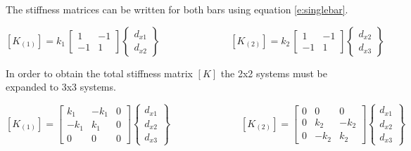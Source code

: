 \begin{enumerate}
    The stiffness matrices can be written for both bars using equation \ref{e:singlebar}.

    \begin{equation}
      \left[K_{(1)}\right] = k_1 \,
      \left[ \begin{array}{rr}
          1  &-1   \\
          -1  &1
        \end{array} \right]
      \begin{Bmatrix}
        d_{x1} \\ d_{x2}
      \end{Bmatrix}
      \hspace{3cm}
      \left[K_{(2)}\right] = k_2 \,
      \left[ \begin{array}{rr}
          1  &-1   \\
          -1  &1
        \end{array} \right]
      \begin{Bmatrix}
        d_{x2} \\ d_{x3}
      \end{Bmatrix}
    \end{equation}

    In order to obtain the total stiffness matrix $[K]$ the 2x2
    systems must be expanded to 3x3 systems.
    
    \begin{equation}
      \left[K_{(1)}\right] =
      \left[ \begin{array}{rrr}
          k_1  &-k_1  & 0   \\
          -k_1  & k_1  & 0   \\
          0    & 0    & 0
        \end{array} \right]
      \begin{Bmatrix}
        d_{x1} \\ d_{x2} \\ d_{x3}
      \end{Bmatrix}
      \hspace{3cm}
      \left[K_{(2)}\right] =
      \left[ \begin{array}{rrr}
          0    & 0    & 0   \\
          0    & k_2  &-k_2 \\
          0    &-k_2  & k_2
        \end{array} \right]
      \begin{Bmatrix}
        d_{x1} \\ d_{x2} \\ d_{x3}
      \end{Bmatrix}
    \end{equation}


\end{enumerate}
